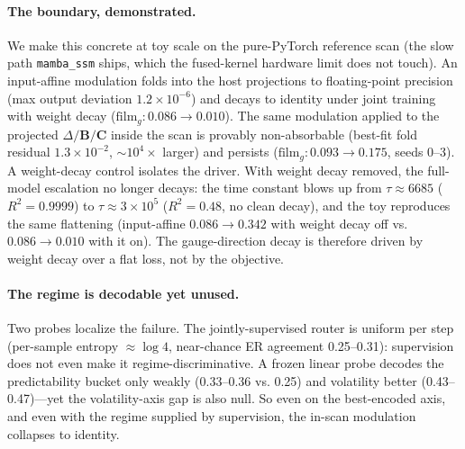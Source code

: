 \documentclass{article}
\newcommand{\filmG}{\mathrm{film}_g}
\begin{document}
\paragraph{The boundary, demonstrated.} We make this concrete at toy scale on the pure-PyTorch reference scan (the slow path \texttt{mamba\_ssm} ships, which the fused-kernel hardware limit does not touch). An input-affine modulation folds into the host projections to floating-point precision (max output deviation $1.2\times10^{-6}$) and decays to identity under joint training with weight decay ($\filmG:0.086\to0.010$). The same modulation applied to the projected $\Delta/\mathbf{B}/\mathbf{C}$ inside the scan is provably non-absorbable (best-fit fold residual $1.3\times10^{-2}$, $\sim10^4\times$ larger) and persists ($\filmG:0.093\to0.175$, seeds 0--3). A weight-decay control isolates the driver. With weight decay removed, the full-model escalation no longer decays: the time constant blows up from $\tau\approx6685$ ($R^2=0.9999$) to $\tau\approx3\times10^5$ ($R^2=0.48$, no clean decay), and the toy reproduces the same flattening (input-affine $0.086\to0.342$ with weight decay off vs. $0.086\to0.010$ with it on). The gauge-direction decay is therefore driven by weight decay over a flat loss, not by the objective.

\paragraph{The regime is decodable yet unused.} Two probes localize the failure. The jointly-supervised router is uniform per step (per-sample entropy $\approx\log4$, near-chance ER agreement 0.25--0.31): supervision does not even make it regime-discriminative. A frozen linear probe decodes the predictability bucket only weakly (0.33--0.36 vs. 0.25) and volatility better (0.43--0.47)---yet the volatility-axis gap is also null. So even on the best-encoded axis, and even with the regime supplied by supervision, the in-scan modulation collapses to identity.
\end{document}
